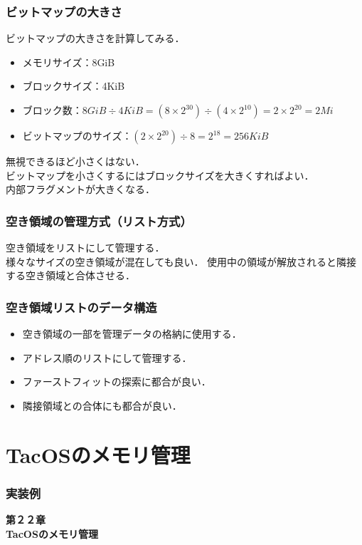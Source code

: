 \documentclass[unicode,handout]{beamer}                   %
\begin{document}
\begin{frame}
  \frametitle{ビットマップの大きさ}
  ビットマップの大きさを計算してみる．
  \begin{itemize}
  \item メモリサイズ：8GiB
  \item ブロックサイズ：4KiB
  \item ブロック数：$8GiB \div 4KiB = (8\times 2^{30}) \div (4 \times 2^{10})
    = 2 \times 2^{20} = 2Mi$
  \item ビットマップのサイズ：$(2 \times 2^{20}) \div 8 = 2^{18} = 256KiB$
  \end{itemize}
  無視できるほど小さくはない．\\
  ビットマップを小さくするにはブロックサイズを大きくすればよい．\\
  内部フラグメントが大きくなる．
\end{frame}

\begin{frame}
  \frametitle{空き領域の管理方式（リスト方式）}
  空き領域をリストにして管理する．\\
  様々なサイズの空き領域が混在しても良い．
  \vfill
  \vfill
  使用中の領域が解放されると隣接する空き領域と合体させる．
\end{frame}

\begin{frame}
  \frametitle{空き領域リストのデータ構造}
  \begin{itemize}
    \item 空き領域の一部を管理データの格納に使用する．
    \item アドレス順のリストにして管理する．
    \item ファーストフィットの探索に都合が良い．
    \item 隣接領域との合体にも都合が良い．
  \end{itemize}
\end{frame}

\section{TacOSのメモリ管理}
\begin{frame}
  \frametitle{実装例}
  \vfill
  \begin{center}
    \textbf{\LARGE 第２２章} \\
    \textbf{\Huge TacOSのメモリ管理} \\
    \vfill
  \end{center}
  \vfill
\end{frame}
\end{document}
